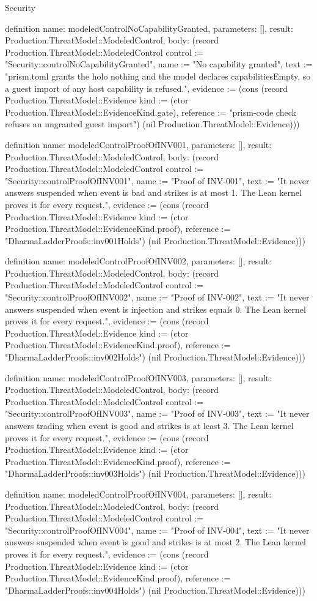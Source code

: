 \begin{lexlean}{Security}
\begin{semanticmodule}
definition{
  name: modeledControlNoCapabilityGranted,
  parameters: [],
  result: Production.ThreatModel::ModeledControl,
  body: (record Production.ThreatModel::ModeledControl {control := "Security::controlNoCapabilityGranted", name := "No capability granted", text := "prism.toml grants the holo nothing and the model declares capabilitiesEmpty, so a guest import of any host capability is refused.", evidence := (cons (record Production.ThreatModel::Evidence {kind := (ctor Production.ThreatModel::EvidenceKind.gate), reference := "prism-code check refuses an ungranted guest import"}) (nil Production.ThreatModel::Evidence))})
}

definition{
  name: modeledControlProofOfINV001,
  parameters: [],
  result: Production.ThreatModel::ModeledControl,
  body: (record Production.ThreatModel::ModeledControl {control := "Security::controlProofOfINV001", name := "Proof of INV-001", text := "It never answers suspended when event is bad and strikes is at most 1. The Lean kernel proves it for every request.", evidence := (cons (record Production.ThreatModel::Evidence {kind := (ctor Production.ThreatModel::EvidenceKind.proof), reference := "DharmaLadderProofs::inv001Holds"}) (nil Production.ThreatModel::Evidence))})
}

definition{
  name: modeledControlProofOfINV002,
  parameters: [],
  result: Production.ThreatModel::ModeledControl,
  body: (record Production.ThreatModel::ModeledControl {control := "Security::controlProofOfINV002", name := "Proof of INV-002", text := "It never answers suspended when event is injection and strikes equals 0. The Lean kernel proves it for every request.", evidence := (cons (record Production.ThreatModel::Evidence {kind := (ctor Production.ThreatModel::EvidenceKind.proof), reference := "DharmaLadderProofs::inv002Holds"}) (nil Production.ThreatModel::Evidence))})
}

definition{
  name: modeledControlProofOfINV003,
  parameters: [],
  result: Production.ThreatModel::ModeledControl,
  body: (record Production.ThreatModel::ModeledControl {control := "Security::controlProofOfINV003", name := "Proof of INV-003", text := "It never answers trading when event is good and strikes is at least 3. The Lean kernel proves it for every request.", evidence := (cons (record Production.ThreatModel::Evidence {kind := (ctor Production.ThreatModel::EvidenceKind.proof), reference := "DharmaLadderProofs::inv003Holds"}) (nil Production.ThreatModel::Evidence))})
}

definition{
  name: modeledControlProofOfINV004,
  parameters: [],
  result: Production.ThreatModel::ModeledControl,
  body: (record Production.ThreatModel::ModeledControl {control := "Security::controlProofOfINV004", name := "Proof of INV-004", text := "It never answers suspended when event is good and strikes is at most 2. The Lean kernel proves it for every request.", evidence := (cons (record Production.ThreatModel::Evidence {kind := (ctor Production.ThreatModel::EvidenceKind.proof), reference := "DharmaLadderProofs::inv004Holds"}) (nil Production.ThreatModel::Evidence))})
}


\end{semanticmodule}
\end{lexlean}
